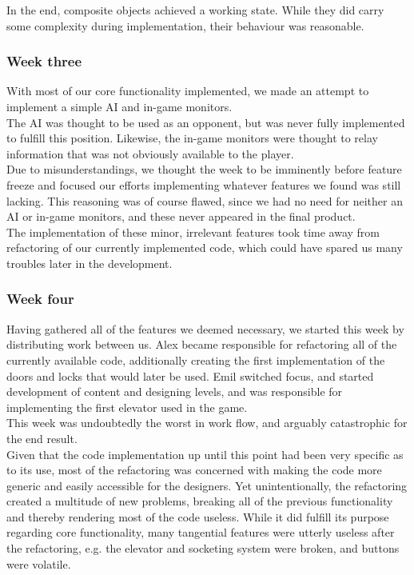 In the end, composite objects achieved a working state. While they did carry some complexity during implementation, their behaviour was reasonable.

\subsubsection{Week three}
With most of our core functionality implemented, we made an attempt to implement a simple AI and in-game monitors.\\

The AI was thought to be used as an opponent, but was never fully implemented to fulfill this position. Likewise, the in-game monitors were thought to relay information that was not obviously available to the player.\\

Due to misunderstandings, we thought the week to be imminently before feature freeze and focused our efforts implementing whatever features we found was still lacking. This reasoning was of course flawed, since we had no need for neither an AI or in-game monitors, and these never appeared in the final product.\\

The implementation of these minor, irrelevant features took time away from refactoring of our currently implemented code, which could have spared us many troubles later in the development.

\subsubsection{Week four}
Having gathered all of the features we deemed necessary, we started this week by distributing work between us. Alex became responsible for refactoring all of the currently available code, additionally creating the first implementation of the doors and locks that would later be used. Emil switched focus, and started development of content and designing levels, and was responsible for implementing the first elevator used in the game.\\

This week was undoubtedly the worst in work flow, and arguably catastrophic for the end result.\\

Given that the code implementation up until this point had been very specific as to its use, most of the refactoring was concerned with making the code more generic and easily accessible for the designers. Yet unintentionally, the refactoring created a multitude of new problems, breaking all of the previous functionality and thereby rendering most of the code useless. While it did fulfill its purpose regarding core functionality, many tangential features were utterly useless after the refactoring, e.g. the elevator and socketing system were broken, and buttons were volatile.\\

